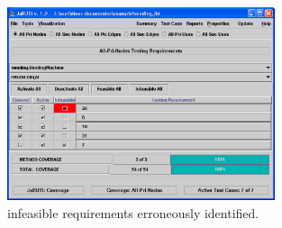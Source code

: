 \begin{figure}[!ht]
\begin{center}
\includegraphics[width=0.70\textwidth]{fig/required-elements-covered-infeasible}
\caption{\label{fig:covered-infeasible} 
infeasible requirements erroneously identified.}
\end{center}
\end{figure}

